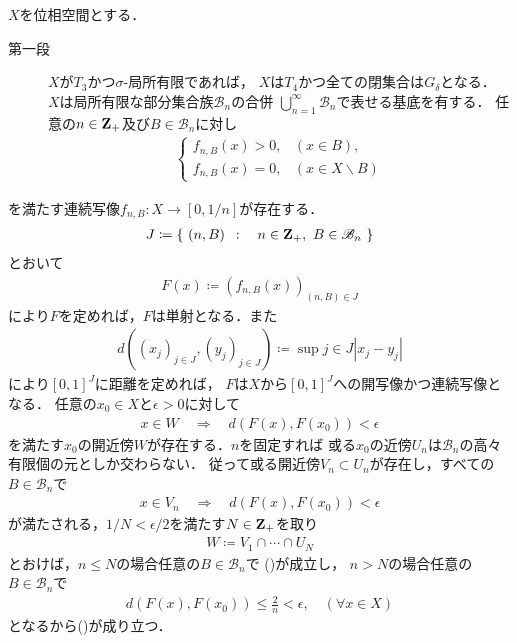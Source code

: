	\begin{prf} $X$を位相空間とする．\mbox{}
		\begin{description}
			\item[第一段] $X$が$T_3$かつ$\sigma$-局所有限であれば，
				$X$は$T_4$かつ全ての閉集合は$G_\delta$となる．
				$X$は局所有限な部分集合族$\mathscr{B}_n$の合併
				$\bigcup_{n=1}^\infty \mathscr{B}_n$で表せる基底を有する．
				任意の$n \in \mathbf{Z}_+$及び$B \in \mathscr{B}_n$に対し
				\begin{align}
					\begin{cases}
						f_{n,B}(x) > 0, & (x \in B), \\
						f_{n,B}(x) = 0, & (x \in X \backslash B)
					\end{cases}
				\end{align}
		\end{description}
		を満たす連続写像$f_{n,B}:X \longrightarrow [0,1/n]$が存在する．
		\begin{align}
			J \coloneqq \left\{\ (n,B)\ \, : \quad n \in \mathbf{Z}_+,\ B \in \mathscr{B}_n\ \right\}
		\end{align}
		とおいて
		\begin{align}
			F(x) \coloneqq \left(f_{n,B}(x)\right)_{(n,B) \in J}
		\end{align}
		により$F$を定めれば，$F$は単射となる．また
		\begin{align}
			d\left((x_j)_{j \in J},(y_j)_{j \in J}\right)
			\coloneqq \sup{j \in J}{|x_j - y_j|}
		\end{align}
		により$[0,1]^J$に距離を定めれば，
		$F$は$X$から$[0,1]^J$への開写像かつ連続写像となる．
		任意の$x_0 \in X$と$\epsilon > 0$に対して
		\begin{align}
			x \in W \quad \Longrightarrow \quad d(F(x),F(x_0)) < \epsilon
			\label{eq:thm_Nagata_Smirnov_metrizability_1}
		\end{align}
		を満たす$x_0$の開近傍$W$が存在する．$n$を固定すれば
		或る$x_0$の近傍$U_n$は$\mathscr{B}_n$の高々有限個の元としか交わらない．
		従って或る開近傍$V_n \subset U_n$が存在し，すべての$B \in \mathscr{B}_n$で
		\begin{align}
			x \in V_n \quad \Longrightarrow \quad d(F(x),F(x_0)) < \epsilon
			\label{eq:thm_Nagata_Smirnov_metrizability_2}
		\end{align}
		が満たされる，$1/N < \epsilon/2$を満たす$N \in \mathbf{Z}_+$を取り
		\begin{align}
			W \coloneqq V_1 \cap \cdots \cap U_N
		\end{align}
		とおけば，$n \leq N$の場合任意の$B \in \mathscr{B}_n$で
		()が成立し，
		$n > N$の場合任意の$B \in \mathscr{B}_n$で
		\begin{align}
			d(F(x),F(x_0)) \leq \frac{2}{n} < \epsilon, \quad (\forall x \in X)
		\end{align}
		となるから()が成り立つ．
	\end{prf}